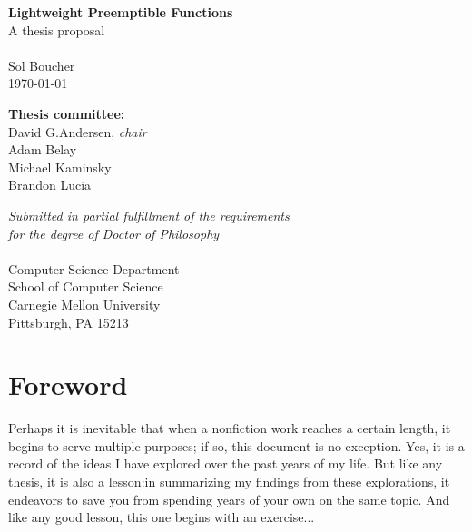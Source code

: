 \documentclass[12pt,letterpaper,openright]{report}
\begin{document}
\begin{titlepage}
\begin{center}
	\vspace*{\fill}

	\textbf{\Large Lightweight Preemptible Functions} \\
	A thesis proposal \\
	\hfill \\
	{\large Sol Boucher} \\
	\today \\

	\vspace{1in}

	\textbf{Thesis committee:} \\
	David G.\@ Andersen, \textit{chair} \\
	Adam Belay \\
	Michael Kaminsky \\
	Brandon Lucia \\

	\vspace{\fill}

	\textit{Submitted in partial fulfillment of the requirements \\
	for the degree of Doctor of Philosophy} \\
	\hfill \\
	Computer Science Department \\
	School of Computer Science \\
	Carnegie Mellon University \\
	Pittsburgh, PA 15213 \\
\end{center}
\end{titlepage}

\tableofcontents
\listoffigures
\listoftables
\lstlistoflistings
\newpage
{}

\ifdefined\foreword
\chapter*{Foreword}

Perhaps it is inevitable that when a nonfiction work reaches a certain length, it
begins to serve multiple purposes; if so, this document is no exception.  Yes, it is
a record of the ideas I have explored over the past years of my life.  But like any
thesis, it is also a lesson:\@ in summarizing my findings from these explorations, it
endeavors to save you from spending years of your own on the same topic.  And like
any good lesson, this one begins with an exercise...
\end{document}
